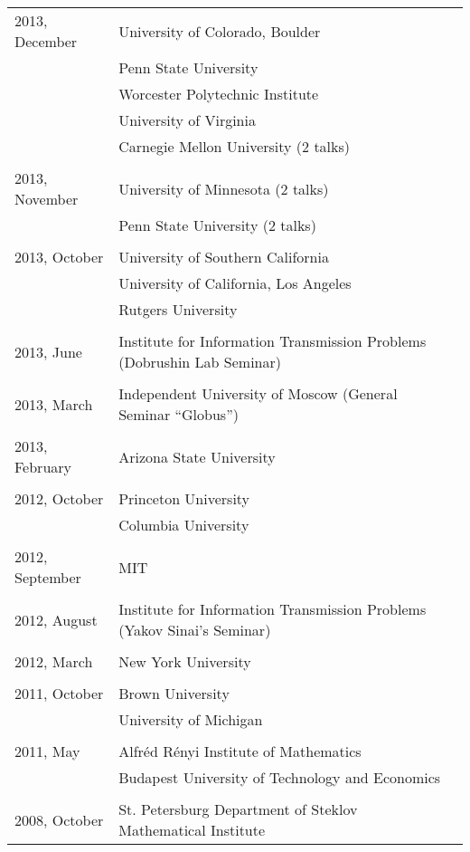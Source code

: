 \documentclass[letterpaper,11pt]{article}
\begin{document}
\begin{longtable}{llc}
	2013, December
	& University of Colorado, Boulder
	\\&Penn State University\\&Worcester Polytechnic Institute
	\\&University of Virginia\\&
	Carnegie Mellon University (2 talks)\\\\

	2013, November&
	University of Minnesota (2 talks)\\&
	Penn State University (2 talks)\\\\

	2013, October&
	University of Southern California
	\\&
	University of California, Los Angeles
	\\&Rutgers University\\\\

	2013, June& Institute for Information Transmission Problems
	(Dobrushin Lab Seminar)\\\\

	2013, March& Independent University of Moscow (General Seminar
	``Globus'')\\\\

	2013, February & Arizona State University\\\\

	2012, October & Princeton University \\
	& Columbia University\\\\

	2012, September & MIT \\\\

	2012, August
	& Institute for Information Transmission Problems
	(Yakov Sinai's Seminar)
	\\\\

	2012, March & New York University\\\\

	2011, October & Brown University \\
	&University of Michigan
	\\
	\\
	2011, May& Alfr\'ed R\'enyi Institute of Mathematics
	\\
	& Budapest University of Technology and Economics
	\\\\

	2008, October &
	St. Petersburg Department of Steklov Mathematical
	Institute%
	\\
\end{longtable}
\bigskip
\end{document}
